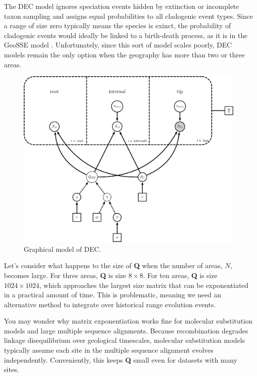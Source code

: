 \documentclass[11pt]{article}
\begin{document}
The DEC model ignores speciation events hidden by extinction or incomplete taxon sampling and assigns equal probabilities to all cladogenic event types.
Since a range of size zero typically means the species is exinct, the probability of cladogenic events would ideally be linked to a birth-death process, as it is in the GeoSSE model \citep{goldberg11}.
Unfortunately, since this sort of model scales poorly, DEC models remain the only option when the geography has more than two or three areas.


\begin{figure}[H]
\centering
\includegraphics[width=5in]{figures/bg_dec_dag}
\caption{Graphical model of DEC.}
\end{figure}

Let's consider what happens to the size of \textbf{Q} when the number of areas, $N$, becomes large.
For three areas, \textbf{Q} is size $8 \times 8$.
For ten areas, \textbf{Q} is size $1024 \times 1024$, which approaches the largest size matrix that can be exponentiated in a practical amount of time.
This is problematic, meaning we need an alternative method to integrate over historical range evolution events.

You may wonder why matrix exponentiation works fine for molecular substitution models and large multiple sequence alignments.
Because recombination degrades linkage disequilibrium over geological timescales, molecular substitution models typically assume each site in the multiple sequence alignment evolves independently.
Conveniently, this keeps \textbf{Q} small even for datasets with many sites.
\end{document}
